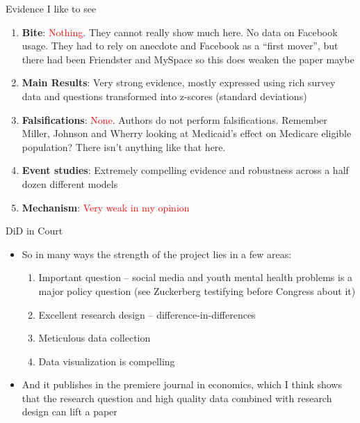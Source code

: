 \documentclass{beamer}
\begin{document}
\begin{frame}{Evidence I like to see}

\begin{enumerate}

\item \textbf{Bite}: \textcolor{red}{Nothing}. They cannot really show much here.  No data on Facebook usage.  They had to rely on anecdote and Facebook as a ``first mover'', but there had been Friendster and MySpace so this does weaken the paper maybe
\item \textbf{Main Results}: Very strong evidence, mostly expressed using rich survey data and questions transformed into z-scores (standard deviations)
\item \textbf{Falsifications}: \textcolor{red}{None}. Authors do not perform falsifications. Remember Miller, Johnson and Wherry looking at Medicaid's effect on Medicare eligible population?  There isn't anything like that here.
\item \textbf{Event studies}: Extremely compelling evidence and robustness across a half dozen different models
\item \textbf{Mechanism}: \textcolor{red}{Very weak in my opinion}

\end{enumerate}

\end{frame}

\begin{frame}{DiD in Court}

\begin{itemize}

\item So in many ways the strength of the project lies in a few areas:
	\begin{enumerate}
	\item Important question -- social media and youth mental health problems is a major policy question (see Zuckerberg testifying before Congress about it)
	\item Excellent research design -- difference-in-differences
	\item Meticulous data collection
	\item Data visualization is compelling
	\end{enumerate}
\item And it publishes in the premiere journal in economics, which I think shows that the research question and high quality data combined with research design can lift a paper

\end{itemize}

\end{frame}
\end{document}
